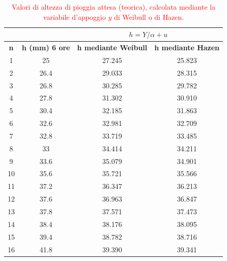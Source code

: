 \begin{table}[H] \centering
    \caption{\textcolor{red}{Valori di altezza di pioggia attesa (teorica), calcolata mediante la variabile d'appoggio $y$ di Weibull o di Hazen.}}
    \begin{tabular}{cccc}
 & & \multicolumn{2}{c}{$h = Y/\alpha + u$}       \\
 \toprule
    \textbf{n} & \textbf{h (mm)  6 ore} & \textbf{h mediante Weibull} & \textbf{h mediante Hazen} \\
\midrule
    1          & 25                          & 27.245                & 25.823                 \\
    2          & 26.4                        & 29.033                & 28.315                 \\
    3          & 26.8                        & 30.285                & 29.782                 \\
    4          & 27.8                        & 31.302                & 30.910                 \\
    5          & 30.4                        & 32.185                & 31.863                 \\
    6          & 32.6                        & 32.981                & 32.709                 \\
    7          & 32.8                        & 33.719                & 33.485                 \\
    8          & 33                          & 34.414                & 34.211                 \\
    9          & 33.6                        & 35.079                & 34.901                 \\
    10         & 35.6                        & 35.721                & 35.566                 \\
    11         & 37.2                        & 36.347                & 36.213                 \\
    12         & 37.6                        & 36.963                & 36.847                 \\
    13         & 37.8                        & 37.571                & 37.473                 \\
    14         & 38.4                        & 38.176                & 38.095                 \\
    15         & 39.4                        & 38.782                & 38.716                 \\
    16         & 41.8                        & 39.390                & 39.341                 \\

\end{tabular}
\end{table}
